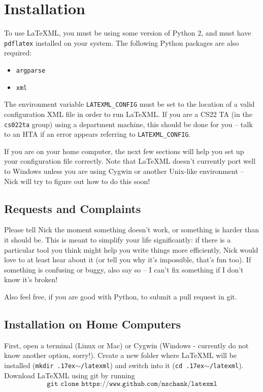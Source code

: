 \section{Installation}
  To use \LaTeX ML, you must be using some version of Python 2, and must have \texttt{pdflatex} installed on your system. The following Python packages are also required:
  
  \begin{itemize}
    \item \texttt{argparse}
    \item \texttt{xml}
  \end{itemize}
  
  The environment variable \texttt{LATEXML\_CONFIG} must be set to the location of a valid configuration XML file in order to run \LaTeX ML. If you are a CS22 TA (in the \texttt{cs022ta} group) using a department machine, this should be done for you -- talk to an HTA if an error appears referring to \texttt{LATEXML\_CONFIG}.
  
  If you are on your home computer, the next few sections will help you set up your configuration file correctly. Note that \LaTeX ML doesn't currently port well to Windows unless you are using Cygwin or another Unix-like environment -- Nick will try to figure out how to do this soon!
  
  \subsection{Requests and Complaints}
    Please tell Nick the moment something doesn't work, or something is harder than it should be. This is meant to simplify your life significantly: if there is a particular tool you think might help you write things more efficiently, Nick would love to at least hear about it (or tell you why it's impossible, that's fun too). If something is confusing or buggy, also say so -- I can't fix something if I don't know it's broken!
    
    Also feel free, if you are good with Python, to submit a pull request in git.
    
  \subsection{Installation on Home Computers}  
    \newcommand\mytilde{\raise.17ex\hbox{$\scriptstyle\sim$}}
    \newcommand\ttquote{\texttt{\char`\"}}
  
    First, open a terminal (Linux or Mac) or Cygwin (Windows - currently do not know another option, sorry!). Create a new folder where \LaTeX ML will be installed (\texttt{mkdir \mytilde/latexml}) and switch into it (\texttt{cd \mytilde/latexml}). Download \LaTeX ML using git by running \[\texttt{git clone https://www.github.com/nschank/latexml}\]
    
